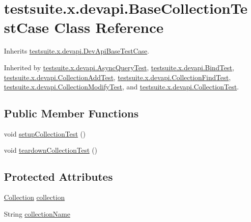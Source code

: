 \hypertarget{classtestsuite_1_1x_1_1devapi_1_1_base_collection_test_case}{}\section{testsuite.\+x.\+devapi.\+Base\+Collection\+Test\+Case Class Reference}
\label{classtestsuite_1_1x_1_1devapi_1_1_base_collection_test_case}


Inherits \mbox{\hyperlink{classtestsuite_1_1x_1_1devapi_1_1_dev_api_base_test_case}{testsuite.\+x.\+devapi.\+Dev\+Api\+Base\+Test\+Case}}.



Inherited by \mbox{\hyperlink{classtestsuite_1_1x_1_1devapi_1_1_async_query_test}{testsuite.\+x.\+devapi.\+Async\+Query\+Test}}, \mbox{\hyperlink{classtestsuite_1_1x_1_1devapi_1_1_bind_test}{testsuite.\+x.\+devapi.\+Bind\+Test}}, \mbox{\hyperlink{classtestsuite_1_1x_1_1devapi_1_1_collection_add_test}{testsuite.\+x.\+devapi.\+Collection\+Add\+Test}}, \mbox{\hyperlink{classtestsuite_1_1x_1_1devapi_1_1_collection_find_test}{testsuite.\+x.\+devapi.\+Collection\+Find\+Test}}, \mbox{\hyperlink{classtestsuite_1_1x_1_1devapi_1_1_collection_modify_test}{testsuite.\+x.\+devapi.\+Collection\+Modify\+Test}}, and \mbox{\hyperlink{classtestsuite_1_1x_1_1devapi_1_1_collection_test}{testsuite.\+x.\+devapi.\+Collection\+Test}}.

\subsection*{Public Member Functions}
\begin{DoxyCompactItemize}
\item 
void \mbox{\hyperlink{classtestsuite_1_1x_1_1devapi_1_1_base_collection_test_case_ad3e7bd1423767b561b28600823a5d3ca}{setup\+Collection\+Test}} ()
\item 
void \mbox{\hyperlink{classtestsuite_1_1x_1_1devapi_1_1_base_collection_test_case_a03fa88da9faf0ab11376bb76c35c89fc}{teardown\+Collection\+Test}} ()
\end{DoxyCompactItemize}
\subsection*{Protected Attributes}
\begin{DoxyCompactItemize}
\item 
\mbox{\hyperlink{interfacecom_1_1mysql_1_1cj_1_1xdevapi_1_1_collection}{Collection}} \mbox{\hyperlink{classtestsuite_1_1x_1_1devapi_1_1_base_collection_test_case_afab9f41edef1f1ad90584af214cf1066}{collection}}
\item 
String \mbox{\hyperlink{classtestsuite_1_1x_1_1devapi_1_1_base_collection_test_case_a93d027ae00f82a26b37d84d4270ff237}{collection\+Name}}
\end{DoxyCompactItemize}

